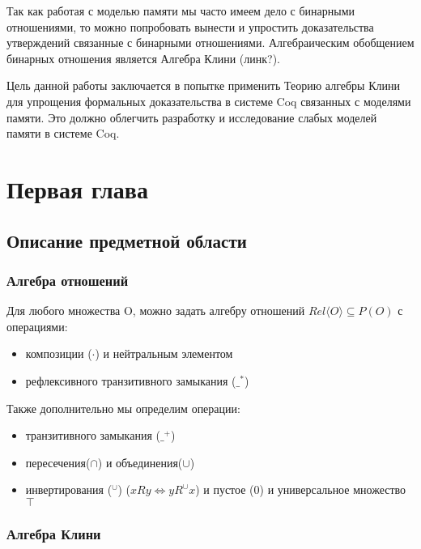 \documentclass[times
              ]{itmo-student-thesis}
\begin{document}
Так как работая с моделью памяти мы часто имеем дело с бинарными отношениями, то можно попробовать вынести и упростить доказательства утверждений связанные с бинарными отношениями. Алгебраическим обобщением бинарных отношения является Алгебра Клини (линк?).

Цель данной работы заключается в попытке применить Теорию алгебры Клини для упрощения формальных доказательства в системе Coq связанных с моделями памяти. Это должно облегчить разработку и исследование слабых моделей памяти в системе Coq.

\chapter{Первая глава}

  \section{Описание предметной области}

    \subsection{Алгебра отношений}
      Для любого множества O, можно задать алгебру отношений $ Rel\langle O \rangle \subseteq P(O) $ с операциями:

      \begin{itemize}
        \item композиции ($ \cdot $) и нейтральным элементом
        \item рефлексивного транзитивного замыкания ($ \_^* $)
      \end{itemize}

      Также дополнительно мы определим операции:

      \begin{itemize}
        \item транзитивного замыкания ($ \_^{+} $)
        \item пересечения($ \cap $) и объединения($ \cup $)
        \item инвертирования ($ ^\cup $) ($ x R y \Leftrightarrow y R^\cup x $)
      и пустое ($0$) и универсальное множество $ \top $
      \end{itemize}

    \subsection{Алгебра Клини}
\end{document}
